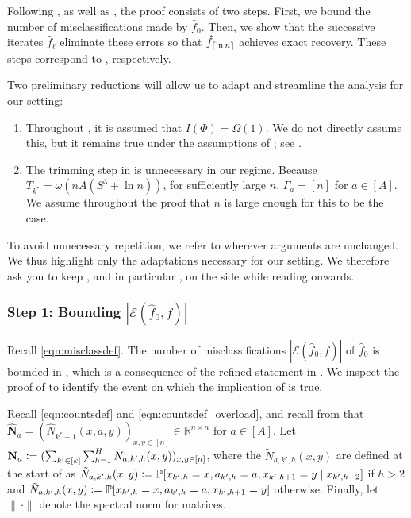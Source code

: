 \documentclass[11pt]{article}
\newcommand{\eqdef}{\vcentcolon=}
\newcommand{\mcE}{\mathcal{E}}
\newcommand{\mbbP}{\mathbb{P}}
\DeclarePairedDelimiter\ceil{\lceil}{\rceil}
\theoremstyle{definition}
\theoremstyle{definition}
\begin{document}
Following \cite{Jedra:2022}, as well as \cite{yun2014community,Sanders:2020}, the proof consists of two steps.
First, we bound the number of misclassifications made by $\hat{f}_0$.
Then, we show that the successive iterates $\hat{f}_{\ell}$ eliminate these errors so that $\hat{f}_{\ceil{\ln n}}$ achieves exact recovery.
These steps correspond to \cite[Theorems 2 and 3]{Jedra:2022}, respectively.

Two preliminary reductions will allow us to adapt and streamline the analysis for our setting:
\begin{enumerate}
	\item
	      Throughout \cite{Jedra:2022}, it is assumed that $I(\Phi)=\Omega(1)$.
	      We do not directly assume this, but it remains true under the assumptions of ; see .
	\item
	      The trimming step in \cite[Algorithm 1]{Jedra:2022} is unnecessary in our regime.
		  Because $T_{k^*}=\omega(nA(S^3+\ln n))$, for sufficiently large $n$, $\Gamma_a=[n]$ for $a\in[A]$.
	      We assume throughout the proof that $n$ is large enough for this to be the case.
\end{enumerate}

To avoid unnecessary repetition, we refer to \cite{Jedra:2022} wherever arguments are unchanged.
We thus highlight only the adaptations necessary for our setting.
We therefore ask you to keep \cite{Jedra:2022}, and in particular \cite[Appendix F and G]{Jedra:2022}, on the side while reading onwards.

\subsubsection*{Step 1: Bounding $|\mcE(\hat{f}_{0},f)|$}

Recall \eqref{eqn:misclassdef}.
The number of misclassifications $|\mcE(\hat{f}_{0},f)|$ of $\hat{f}_{0}$ is bounded in \cite[Theorem 2]{Jedra:2022}, which is a consequence of the refined statement in \cite[Theorem 11]{Jedra:2022}.
We inspect the proof of \cite[Theorem 11]{Jedra:2022} to identify the event on which the implication of \cite[Theorem 2]{Jedra:2022} is true.

Recall \eqref{eqn:countsdef} and \eqref{eqn:countsdef_overload}, and recall from  that $\hat{\mathbf{N}}_a=(\hat{N}_{k^*+1}(x,a,y))_{x,y\in[n]}\in\mathbb{R}^{n\times n}$ for $a\in[A]$.
Let $\mathbf{N}_a \eqdef (\sum_{k'\in[k]}\sum_{h=1}^H\allowbreak\tilde{N}_{a,k',h}(x,y))_{x,y\in[n]}$, where the $\tilde{N}_{a,k',h}(x,y)$ are defined at the start of \cite[Appendix F.1]{Jedra:2022} as $\tilde{N}_{a,k',h}(x,y)\eqdef  \mbbP[x_{k',h}=x,a_{k',h}=a,x_{k',h+1}=y\mid x_{k',h-2}]$ if $h>2$ and $\tilde{N}_{a,k',h}(x,y) \eqdef \mbbP[x_{k',h}=x,a_{k',h}=a,x_{k',h+1}=y]$ otherwise.
Finally, let $\lVert \,\cdot  \rVert$ denote the spectral norm for matrices.
\end{document}
